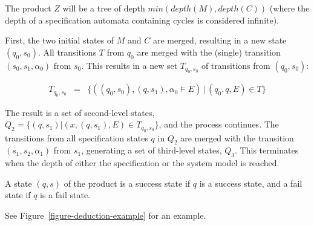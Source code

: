 \documentclass[a4paper,11pt]{kth-mag}
\theoremstyle{definition}
\begin{document}
The product $Z$ will be a tree of depth $min(depth(M), depth(C))$ (where the
depth of a specification automata containing cycles is considered infinite).

First, the two initial states of $M$ and $C$ are merged, resulting in a new
state $(q_0,s_0)$. All transitions $T$ from $q_0$ are merged with the (single)
transition $(s_0, s_1, \alpha_0)$ from $s_0$. This results in a new set
$T_{q_0,s_0}$ of transitions from $(q_0,s_0)$:

\medskip
\[
  \begin{array}{rcl}
    T_{q_0,s_0} & = & \{((q_0,s_0), (q,s_1), \alpha_0 \models E) \, | \, (q_0, q, E) \in T \}
  \end{array}
\]
\medskip

The result is a set of second-level states, $Q_2 = \{(q,s_1) | (x, (q,s_1),
E) \in T_{q_0,s_0}\}$, and the process continues. The transitions from all
specification states $q$ in $Q_2$ are merged with the transition $(s_1, s_2,
\alpha_1)$ from $s_1$, generating a set of third-level states, $Q_3$. This
terminates when the depth of either the specification or the system model is
reached.

A state $(q, s)$ of the product is a success state if $q$ is a success state,
and a fail state if $q$ is a fail state.

See Figure~\ref{figure-deduction-example} for an example.
\end{document}
